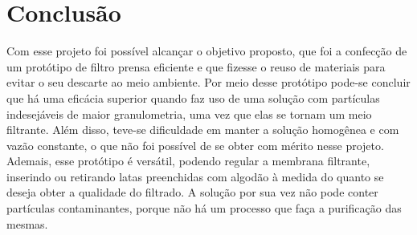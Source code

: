 \chapter{Conclusão}
\label{chap:conclusao}

Com esse projeto foi possível alcançar o objetivo proposto, que foi a confecção
de um protótipo de filtro prensa eficiente e que fizesse o reuso de materiais
para evitar o seu descarte ao meio ambiente. Por meio desse protótipo pode-se
concluir que há uma eficácia superior quando faz uso de uma solução com
partículas indesejáveis de maior granulometria, uma vez que elas se tornam um
meio filtrante. Além disso, teve-se dificuldade em manter a solução homogênea e
com vazão constante, o que não foi possível de se obter com mérito nesse
projeto. Ademais, esse protótipo é versátil, podendo regular a membrana
filtrante, inserindo ou retirando latas preenchidas com algodão à medida do
quanto se deseja obter a qualidade do filtrado. A solução por sua vez não pode
conter partículas contaminantes, porque não há um processo que faça a
purificação das mesmas.


